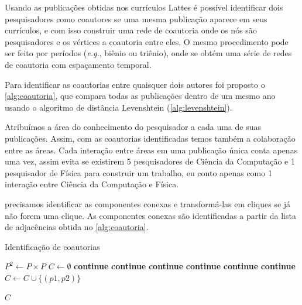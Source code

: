 Usando as publicações obtidas nos currículos Lattes é possível identificar dois pesquisadores como coautores se uma mesma publicação aparece em seus currículos, e com isso construir uma rede de coautoria onde os nós são pesquisadores e os vértices a coautoria entre eles. O mesmo procedimento pode ser feito por períodos (\textit{e.g.}, biênio ou triênio), onde se obtém uma série de redes de coautoria com espaçamento temporal.

Para identificar as coautorias entre quaisquer dois autores foi proposto o \autoref{alg:coautoria}, que compara todas as publicações dentro de um mesmo ano usando o algoritmo de distância Levenshtein (\autoref{alg:levenshtein}).

Atribuímos a área do conhecimento do pesquisador a cada uma de suas publicações. Assim, com as coautorias identificadas temos também a colaboração entre as áreas. Cada interação entre áreas em uma publicação única conta apenas uma vez, assim evita se existirem 5 pesquisadores de Ciência da Computação e 1 pesquisador de Física para construir um trabalho, eu conto apenas como 1 interação entre Ciência da Computação e Física.



precisamos identificar as componentes conexas e transformá-las em cliques se já não forem uma clique. As componentes conexas são identificadas a partir da lista de adjacências obtida no \autoref{alg:coautoria}.




\begin{algorithm}
\caption{Identificação de coautorias}
\label{alg:coautoria}
\begin{algorithmic}[1]

\State $P^2\gets P\times{P}$
\State $C\gets \emptyset$
\State \textbf{continue}
\State \textbf{continue}
\State \textbf{continue}
\State \textbf{continue}
\State \textbf{continue}
\State \textbf{continue}
\Else
\State $C\gets C\cup\{(p1, p2)\}$
\EndIf
\EndFor

\State \Return $C$
\EndProcedure

\end{algorithmic}
\end{algorithm}

